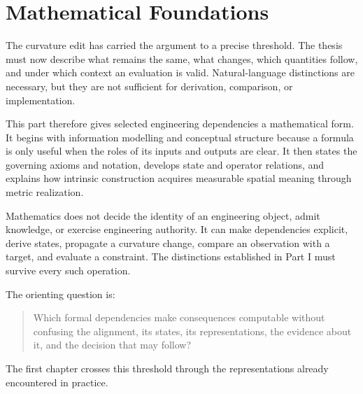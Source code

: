 
\chapter*{Mathematical Foundations}
{}

The curvature edit has carried the argument to a precise threshold. The thesis
must now describe what remains the same, what changes, which quantities follow,
and under which context an evaluation is valid. Natural-language distinctions
are necessary, but they are not sufficient for derivation, comparison, or
implementation.

This part therefore gives selected engineering dependencies a mathematical
form. It begins with information modelling and conceptual structure because a
formula is only useful when the roles of its inputs and outputs are clear. It
then states the governing axioms and notation, develops state and operator
relations, and explains how intrinsic construction acquires measurable spatial
meaning through metric realization.

Mathematics does not decide the identity of an engineering object, admit
knowledge, or exercise engineering authority. It can make dependencies explicit,
derive states, propagate a curvature change, compare an observation with a
target, and evaluate a constraint. The distinctions established in Part I must
survive every such operation.

The orienting question is:

\begin{quote}
Which formal dependencies make consequences computable without confusing the
alignment, its states, its representations, the evidence about it, and the
decision that may follow?
\end{quote}

The first chapter crosses this threshold through the representations already
encountered in practice.
